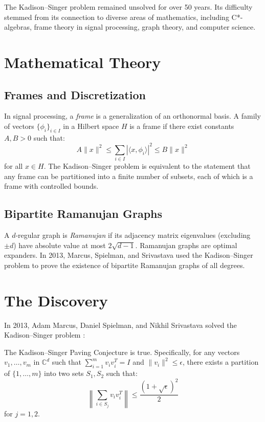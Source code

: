 \begin{historicalbox}
The Kadison--Singer problem remained unsolved for over 50 years. Its difficulty stemmed from its connection to diverse areas of mathematics, including C*-algebras, frame theory in signal processing, graph theory, and computer science.
\end{historicalbox}

\section{Mathematical Theory}

\subsection{Frames and Discretization}
In signal processing, a \emph{frame} is a generalization of an orthonormal basis. A family of vectors $\{\phi_i\}_{i \in I}$ in a Hilbert space $H$ is a frame if there exist constants $A, B > 0$ such that:
\begin{equation}
A \|x\|^2 \leq \sum_{i \in I} |\langle x, \phi_i \rangle|^2 \leq B \|x\|^2
\end{equation}
for all $x \in H$. The Kadison--Singer problem is equivalent to the statement that any frame can be partitioned into a finite number of subsets, each of which is a frame with controlled bounds.

\subsection{Bipartite Ramanujan Graphs}
A $d$-regular graph is \emph{Ramanujan} if its adjacency matrix eigenvalues (excluding $\pm d$) have absolute value at most $2\sqrt{d-1}$. Ramanujan graphs are optimal expanders. In 2013, Marcus, Spielman, and Srivastava used the Kadison--Singer problem to prove the existence of bipartite Ramanujan graphs of all degrees.

\section{The Discovery}

In 2013, Adam Marcus, Daniel Spielman, and Nikhil Srivastava solved the Kadison--Singer problem \cite{marcus2015a, marcus2015b}:

\begin{theorem}
The Kadison--Singer Paving Conjecture is true. Specifically, for any vectors $v_1, \ldots, v_m$ in $\mathbb{C}^d$ such that $\sum_{i=1}^m v_i v_i^T = I$ and $\|v_i\|^2 \leq \epsilon$, there exists a partition of $\{1, \ldots, m\}$ into two sets $S_1, S_2$ such that:
\begin{equation}
\left\|\sum_{i \in S_j} v_i v_i^T\right\| \leq \frac{(1 + \sqrt{\epsilon})^2}{2}
\end{equation}
for $j=1,2$.
\end{theorem}

